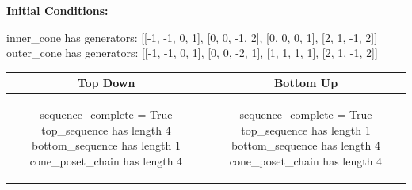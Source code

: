 \documentclass[10pt]{article}
\begin{document}
\textbf{Initial Conditions:}
\begin{SAGE}
inner_cone has generators: 
[[-1, -1, 0, 1], [0, 0, -1, 2], [0, 0, 0, 1], [2, 1, -1, 2]]
outer_cone has generators: 
[[-1, -1, 0, 1], [0, 0, -2, 1], [1, 1, 1, 1], [2, 1, -1, 2]]

\end{SAGE}
\begin{tabular}{c|c}
\textbf{Top Down} & \textbf{Bottom Up} \\ \hline  
\begin{SAGE}
sequence_complete = True
top_sequence has length 4
bottom_sequence has length 1
cone_poset_chain has length 4
\end{SAGE} 
&
\begin{SAGE}
sequence_complete = True
top_sequence has length 1
bottom_sequence has length 4
cone_poset_chain has length 4
\end{SAGE} 
\\ \hline


\end{tabular}
\end{document}
